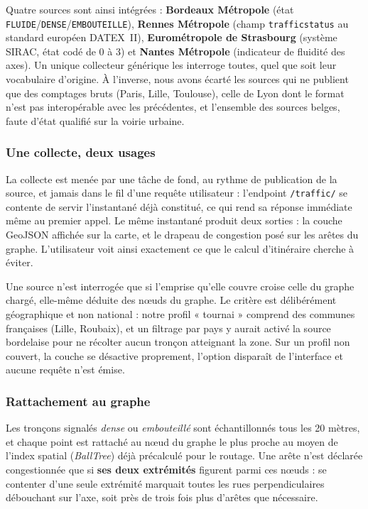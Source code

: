 Quatre sources sont ainsi intégrées : \textbf{Bordeaux Métropole} (état \texttt{FLUIDE}/\texttt{DENSE}/\texttt{EMBOUTEILLE}), \textbf{Rennes Métropole} (champ \texttt{trafficstatus} au standard européen DATEX~II), \textbf{Eurométropole de Strasbourg} (système SIRAC, état codé de 0 à 3) et \textbf{Nantes Métropole} (indicateur de fluidité des axes). Un unique collecteur générique les interroge toutes, quel que soit leur vocabulaire d'origine. À l'inverse, nous avons écarté les sources qui ne publient que des comptages bruts (Paris, Lille, Toulouse), celle de Lyon dont le format n'est pas interopérable avec les précédentes, et l'ensemble des sources belges, faute d'état qualifié sur la voirie urbaine.

\subsubsection{Une collecte, deux usages}

La collecte est menée par une tâche de fond, au rythme de publication de la source, et jamais dans le fil d'une requête utilisateur : l'endpoint \texttt{/traffic/} se contente de servir l'instantané déjà constitué, ce qui rend sa réponse immédiate même au premier appel. Le même instantané produit deux sorties : la couche GeoJSON affichée sur la carte, et le drapeau de congestion posé sur les arêtes du graphe. L'utilisateur voit ainsi exactement ce que le calcul d'itinéraire cherche à éviter.

Une source n'est interrogée que si l'emprise qu'elle couvre croise celle du graphe chargé, elle-même déduite des nœuds du graphe. Le critère est délibérément géographique et non national : notre profil « tournai » comprend des communes françaises (Lille, Roubaix), et un filtrage par pays y aurait activé la source bordelaise pour ne récolter aucun tronçon atteignant la zone. Sur un profil non couvert, la couche se désactive proprement, l'option disparaît de l'interface et aucune requête n'est émise.

\subsubsection{Rattachement au graphe}

Les tronçons signalés \textit{dense} ou \textit{embouteillé} sont échantillonnés tous les 20 mètres, et chaque point est rattaché au nœud du graphe le plus proche au moyen de l'index spatial (\textit{BallTree}) déjà précalculé pour le routage. Une arête n'est déclarée congestionnée que si \textbf{ses deux extrémités} figurent parmi ces nœuds : se contenter d'une seule extrémité marquait toutes les rues perpendiculaires débouchant sur l'axe, soit près de trois fois plus d'arêtes que nécessaire.

